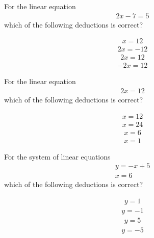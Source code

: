 \documentclass{webquiz}
\begin{document}
\begin{question} %
For the linear equation
\begin{gather*} 
2x-7=5
\end{gather*}
which of the following deductions is correct?
\begin{choice}[columns=1] %
\incorrect
\begin{gather*} 
x=12
\end{gather*}
\incorrect
\begin{gather*} 
2x=-12
\end{gather*}
\correct
\begin{gather*} 
2x=12
\end{gather*}
\incorrect
\begin{gather*} 
-2x=12
\end{gather*}
\end{choice}
\end{question}


\begin{question} %
For the linear equation
\begin{gather*} 
2x=12
\end{gather*}
which of the following deductions is correct?
\begin{choice}[columns=1] %
\incorrect
\begin{gather*} 
x=12
\end{gather*}
\incorrect
\begin{gather*} 
x=24
\end{gather*}
\correct
\begin{gather*} 
x=6
\end{gather*}
\incorrect
\begin{gather*} 
x=1
\end{gather*}
\end{choice}
\end{question}


\begin{question} %
For the system of linear equations
\begin{gather*}
y=-x+5\\
x=6
\end{gather*}
which of the following deductions is correct?
\begin{choice}[columns=1] %
\incorrect
\begin{gather*} 
y=1
\end{gather*}
\correct
\begin{gather*} 
y=-1
\end{gather*}
\incorrect
\begin{gather*} 
y=5
\end{gather*}
\incorrect
\begin{gather*} 
y=-5
\end{gather*}
\end{choice}
\end{question}
\end{document}
